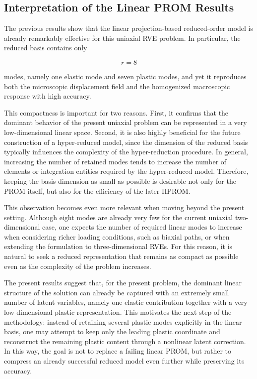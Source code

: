 \documentclass[11pt,a4paper]{article}
\begin{document}
\subsection{Interpretation of the Linear PROM Results}

The previous results show that the linear projection-based reduced-order model is already remarkably effective for this uniaxial RVE problem. In particular, the reduced basis contains only

\begin{equation}
r = 8
\end{equation}

modes, namely one elastic mode and seven plastic modes, and yet it reproduces both the microscopic displacement field and the homogenized macroscopic response with high accuracy.

This compactness is important for two reasons. First, it confirms that the dominant behavior of the present uniaxial problem can be represented in a very low-dimensional linear space. Second, it is also highly beneficial for the future construction of a hyper-reduced model, since the dimension of the reduced basis typically influences the complexity of the hyper-reduction procedure. In general, increasing the number of retained modes tends to increase the number of elements or integration entities required by the hyper-reduced model. Therefore, keeping the basis dimension as small as possible is desirable not only for the PROM itself, but also for the efficiency of the later HPROM.

This observation becomes even more relevant when moving beyond the present setting. Although eight modes are already very few for the current uniaxial two-dimensional case, one expects the number of required linear modes to increase when considering richer loading conditions, such as biaxial paths, or when extending the formulation to three-dimensional RVEs. For this reason, it is natural to seek a reduced representation that remains as compact as possible even as the complexity of the problem increases.

The present results suggest that, for the present problem, the dominant linear structure of the solution can already be captured with an extremely small number of latent variables, namely one elastic contribution together with a very low-dimensional plastic representation. This motivates the next step of the methodology: instead of retaining several plastic modes explicitly in the linear basis, one may attempt to keep only the leading plastic coordinate and reconstruct the remaining plastic content through a nonlinear latent correction. In this way, the goal is not to replace a failing linear PROM, but rather to compress an already successful reduced model even further while preserving its accuracy.
\end{document}
